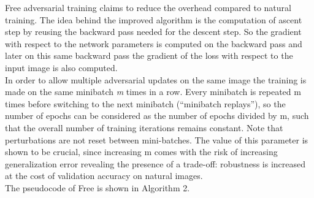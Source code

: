 \documentclass{article}
\begin{document}
Free adversarial training \cite{ShafahiEtAl2019b} claims to reduce the overhead compared to natural training. The idea behind the improved algorithm is the computation of ascent step by reusing the backward pass needed for the descent step. So the gradient with respect to the network parameters is computed on the backward pass and later on this same backward pass the gradient of the loss with respect to the input image is also computed.\\
In order to allow multiple adversarial updates on the same image the training is made on the same minibatch \textit{m} times in a row. Every minibatch is repeated m times before switching to the next minibatch (“minibatch replays”), so the number of epochs can be considered as the number of epochs divided by m, such that the overall number of training iterations remains constant. Note that perturbations are not reset between mini-batches. The value of this parameter is shown to be crucial, since increasing m comes with the risk of increasing generalization error revealing  the presence of a trade-off: robustness is increased at the cost of validation accuracy on natural images.\\
The pseudocode of Free is shown in Algorithm 2.
\end{document}
